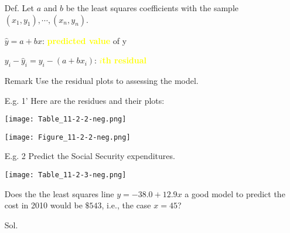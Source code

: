 \begin{frame}

\begin{enumerate}
\item[Def.] Let $a$ and $b$ be the least squares coefficients with the sample $(x_1,y_1),\cdots, (x_n,y_n)$.
\\[1em]
\item[] $\hat y=a+bx$: {\bf \textcolor{yellow}{predicted value}} of y
\\[1em]
\item[] $y_i-\hat y_i = y_i - (a+bx_i)$: {\bf \textcolor{yellow}{$i$th residual}}
\vfill
\item[Remark] Use the residual plots to assessing the model.
\end{enumerate}
\end{frame}
\begin{frame}

\begin{enumerate}
\item[E.g. 1'] Here are the residues and their plots:\\[1em]
\vfill
\begin{minipage}{0.43\textwidth}
\texttt{[image: Table\_11-2-2-neg.png]}
\end{minipage}
\begin{minipage}{0.5\textwidth}
\texttt{[image: Figure\_11-2-2-neg.png]}
\end{minipage}
\end{enumerate}

\end{frame}
\begin{frame}

\begin{enumerate}
\item[E.g. 2] Predict the Social Security expenditures.
\begin{center}
\texttt{[image: Table\_11-2-3-neg.png]}
\end{center}
Does the the least squares line $y=-38.0+12.9x$ a good model to predict the cost in 2010 would be $\$543$, i.e., the case $x=45$?
\vfill
\item[Sol.]
\end{enumerate}
\end{frame}
